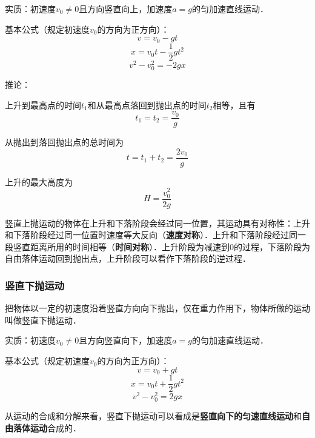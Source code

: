 实质：初速度$v_0\neq0$且方向竖直向上，加速度$a=g$的匀加速直线运动．

基本公式（规定初速度$v_0$的方向为正方向）：
\begin{equation}
v=v_0-gt
\end{equation}
\begin{equation}
x=v_0t-\frac12gt^2
\end{equation}
\begin{equation}
v^2-v_0^2=-2gx
\end{equation}

推论：

上升到最高点的时间$t_1$和从最高点落回到抛出点的时间$t_2$相等，且有
\begin{equation}
t_1=t_2=\frac{v_0}{g}
\end{equation}

从抛出到落回抛出点的总时间为
\begin{equation}
t=t_1+t_2=\frac{2v_0}{g}
\end{equation}

上升的最大高度为
\begin{equation}
H=\frac{v_0^2}{2g}
\end{equation}

竖直上抛运动的物体在上升和下落阶段会经过同一位置，其运动具有对称性：上升和下落阶段经过同一位置时速度等大反向（\textbf{速度对称}）．上升和下落阶段经过同一段竖直距离所用的时间相等（\textbf{时间对称}）．上升阶段为减速到0的过程，下落阶段为自由落体运动回到抛出点，上升阶段可以看作下落阶段的逆过程．

\subsubsection{竖直下抛运动}
把物体以一定的初速度沿着竖直方向向下抛出，仅在重力作用下，物体所做的运动叫做竖直下抛运动．

实质：初速度$v_0\neq0$且方向竖直向下，加速度$a=g$的匀加速直线运动．

基本公式（规定初速度$v_0$的方向为正方向）：
\begin{equation}
v=v_0+gt
\end{equation}
\begin{equation}
x=v_0t+\frac12gt^2
\end{equation}
\begin{equation}
v^2-v_0^2=2gx
\end{equation}

从运动的合成和分解来看，竖直下抛运动可以看成是\textbf{竖直向下的匀速直线运动}和\textbf{自由落体运动}合成的．